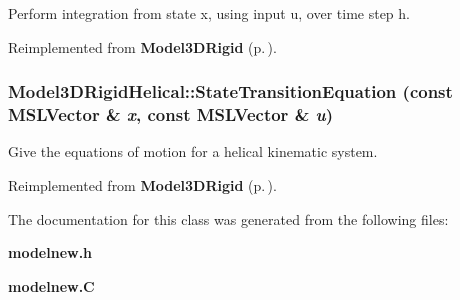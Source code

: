 Perform integration from state x, using input u, over time step h.



Reimplemented from {\bf Model3DRigid} {\rm (p.\,\pageref{class_Model3DRigid_a2})}.
\subsubsection{ Model3DRigid\-Helical::State\-Transition\-Equation (const {\bf MSLVector} \& {\em x}, const {\bf MSLVector} \& {\em u})\hspace{0.3cm}{\tt  [virtual]}}\label{class_Model3DRigidHelical_a2}


Give the equations of motion for a helical kinematic system.



Reimplemented from {\bf Model3DRigid} {\rm (p.\,\pageref{class_Model3DRigid_a3})}.

The documentation for this class was generated from the following files:\begin{CompactItemize}
\item 
{\bf modelnew.h}\item 
{\bf modelnew.C}\end{CompactItemize}
